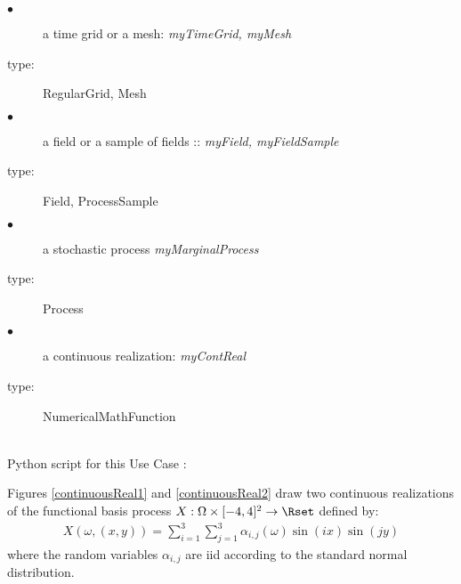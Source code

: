              {
               \begin{description}
               \item[$\bullet$] a time grid or a mesh: {\itshape myTimeGrid, myMesh}
               \item[type:]  RegularGrid, Mesh
               \end{description}

               \begin{description}
               \item[$\bullet$] a field or a  sample of fields :: {\itshape myField, myFieldSample}
               \item[type:]  Field, ProcessSample
               \end{description}

               \begin{description}
               \item[$\bullet$] a stochastic process {\itshape myMarginalProcess}
               \item[type:]  Process
               \end{description}

               \begin{description}
               \item[$\bullet$] a continuous realization: {\itshape myContReal}
               \item[type:] NumericalMathFunction
               \end{description}
             }

             \textspace\\
             Python script for this Use Case :

             Figures \ref{continuousReal1} and \ref{continuousReal2} draw two continuous realizations of the functional basis process  $X: \Omega \times [-4,4]^2 \rightarrow \Rset$ defined by:
             \begin{align}
               X(\omega,(x,y))=\sum_{i=1}^3 \sum_{j=1}^3 \alpha_{i,j}(\omega)\sin(ix) \sin(jy)
             \end{align}
             where the random variables $\alpha_{i,j}$ are iid according to the standard normal distribution.


